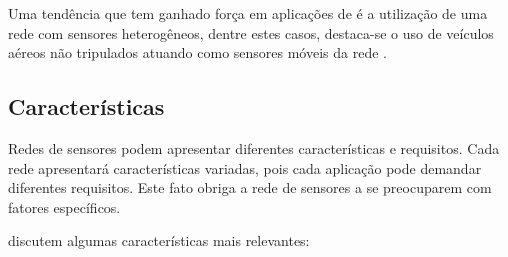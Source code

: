 Uma tendência que tem ganhado força em aplicações de \rssf é a utilização de uma rede com sensores heterogêneos, dentre estes casos, destaca-se o uso de veículos aéreos não tripulados atuando como sensores móveis da rede \cite{Freitas2009}. 


\subsection{Características}
Redes de sensores podem apresentar diferentes características e requisitos. Cada rede apresentará características variadas, pois cada aplicação pode demandar diferentes requisitos.
Este fato obriga a rede de sensores a se preocuparem com fatores específicos.

\cite{Loureiro} discutem algumas características mais relevantes:

